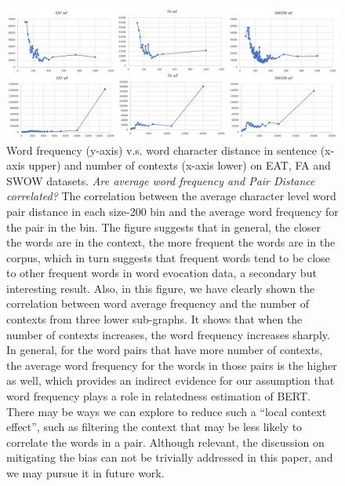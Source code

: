 \documentclass[letterpaper]{article} %
\begin{document}
\begin{figure}[!]
  \includegraphics[width=\linewidth]{stat_vs_wf.png}
  \caption{Word frequency (y-axis) v.s. word character distance in sentence (x-axis upper) and  number of contexts (x-axis lower) on EAT, FA and SWOW datasets. \textit{Are average word frequency and Pair Distance correlated?} The correlation between the average character level word pair distance in each size-200 bin and the average word frequency for the pair in the bin. The figure suggests that in general, the closer the words are in the context, the more frequent the words are in the corpus, which in turn suggests that frequent words tend to be close to other frequent words in word evocation data, a secondary but interesting result. Also, in this figure, we have clearly shown the correlation between word average frequency and the number of contexts from three lower sub-graphs. It shows that when the number of contexts increases, the word frequency increases sharply. In general, for the word pairs that have more number of contexts, the average word frequency for the words in those pairs is the higher as well, which provides an indirect evidence for our assumption that word frequency plays a role in relatedness estimation of BERT. There may be ways we can explore to reduce such a ``local context effect'', such as filtering the context that may be less likely to correlate the words in a pair. Although relevant, the discussion on mitigating the bias can not be trivially addressed in this paper, and we may pursue it in future work.}
  \label{fig:stat_wf}
\end{figure}


\end{document}
